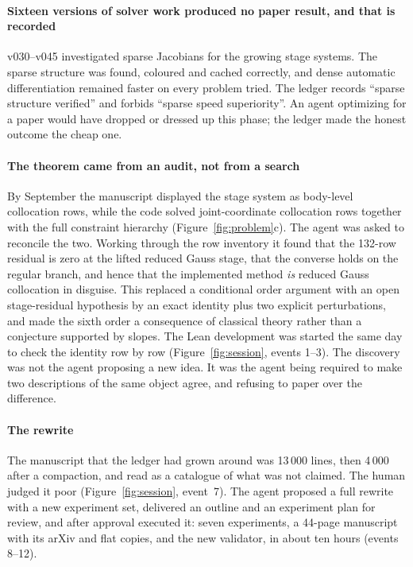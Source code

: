 \paragraph{Sixteen versions of solver work produced no paper result, and that is recorded}
v030--v045 investigated sparse Jacobians for the growing stage systems. The sparse structure was
found, coloured and cached correctly, and dense automatic differentiation remained faster on every
problem tried. The ledger records ``sparse structure verified'' and forbids ``sparse speed
superiority''. An agent optimizing for a paper would have dropped or dressed up this phase; the
ledger made the honest outcome the cheap one.

\paragraph{The theorem came from an audit, not from a search}
By September the manuscript displayed the stage system as body-level collocation rows, while the
code solved joint-coordinate collocation rows together with the full constraint hierarchy
(Figure~\ref{fig:problem}c). The agent was asked to reconcile the two. Working through the row
inventory it found that the 132-row residual is zero at the lifted reduced Gauss stage, that the
converse holds on the regular branch, and hence that the implemented method \emph{is} reduced
Gauss collocation in disguise. This replaced a conditional order argument with an open
stage-residual hypothesis by an exact identity plus two explicit perturbations, and made the sixth
order a consequence of classical theory rather than a conjecture supported by slopes. The Lean
development was started the same day to check the identity row by row (Figure~\ref{fig:session},
events 1--3). The discovery was not the agent proposing a new idea. It was the agent being required
to make two descriptions of the same object agree, and refusing to paper over the difference.

\paragraph{The rewrite}
The manuscript that the ledger had grown around was 13\,000 lines, then 4\,000 after a
compaction, and read as a catalogue of what was not claimed. The human judged it poor
(Figure~\ref{fig:session}, event~7). The agent proposed a full rewrite with a new experiment set,
delivered an outline and an experiment plan for review, and after approval executed it: seven
experiments, a 44-page manuscript with its arXiv and flat copies, and the new validator, in about
ten hours (events 8--12).
